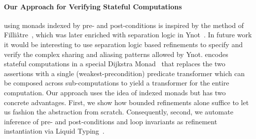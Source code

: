 \paragraph{Our Approach for Verifying Stateful Computations} using monads
indexed by pre- and post-conditions is inspired by the method of
Filli\^atre~\citep{Filliatre98}, which was later enriched with
separation logic in Ynot~\citep{ynot}. In future work it would
be interesting to use separation logic based refinements to specify
and verify the complex sharing and aliasing patterns allowed by Ynot.
%
\fstar encodes stateful computations in a special Dijkstra
Monad~\citep{dijkstramonad} that replaces the two assertions with
a single (weakest-precondition) predicate transformer which
can be composed across sub-computations to yield a transformer
for the entire computation.
%
Our \RIO approach uses the idea of indexed monads but
has two concrete advantages.
%
First, we show how bounded refinements alone suffice to
let us fashion the \RIO abstraction from scratch.
%
Consequently, second, we automate inference of pre- and
post-conditions and loop invariants as refinement instantiation
via Liquid Typing~\citep{LiquidPLDI08}.
